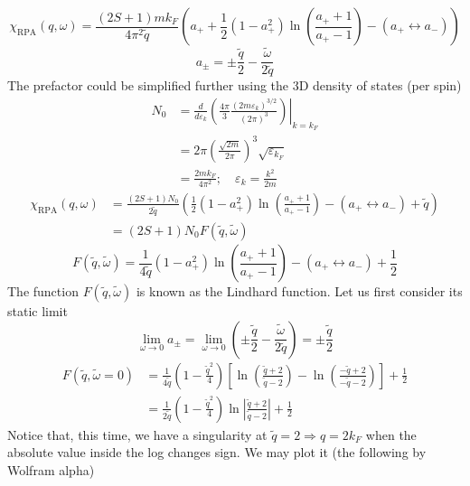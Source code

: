 \[ \chi _{\mathrm{RPA}}\left( q,\omega \right) =\frac{\left( 2S+1 \right) mk_F}{4\pi ^2\tilde{q}}\left( a_++\frac{1}{2}\left( 1-a_{+}^{2} \right) \ln \left( \frac{a_++1}{a_+-1} \right) -\left( a_+\leftrightarrow a_- \right) \right) \]
\[ a_{\pm}=\pm \frac{\tilde{q}}{2}-\frac{\tilde{\omega}}{2\tilde{q}}\]
The prefactor could be simplified further using the 3D density of states (per spin)
\begin{align*}
    N_0&=\left. \frac{d}{d\varepsilon _k}\left( \frac{4\pi}{3}\frac{\left( 2m\varepsilon _k \right) ^{3/2}}{\left( 2\pi \right) ^3} \right) \right|_{k=k_F}\\
    &=2\pi \left( \frac{\sqrt{2m}}{2\pi} \right) ^3\sqrt{\varepsilon _{k_F}}\\
    &=\frac{2mk_F}{4\pi ^2};\quad \varepsilon _k=\frac{k^2}{2m}
\end{align*}
\begin{align*}
    \chi _{\mathrm{RPA}}\left( q,\omega \right) &=\frac{\left( 2S+1 \right) N_0}{2\tilde{q}}\left( \frac{1}{2}\left( 1-a_{+}^{2} \right) \ln \left( \frac{a_++1}{a_+-1} \right) -\left( a_+\leftrightarrow a_- \right) +\tilde{q} \right) \\
    &=\left( 2S+1 \right) N_0F\left( \tilde{q},\tilde{\omega} \right)
\end{align*}
\[ F\left( \tilde{q},\tilde{\omega} \right) =\frac{1}{4\tilde{q}}\left( 1-a_{+}^{2} \right) \ln \left( \frac{a_++1}{a_+-1} \right) -\left( a_+\leftrightarrow a_- \right) +\frac{1}{2}\]
The function $F(\tilde{q},\tilde{\omega})$ is known as the Lindhard function. Let us first consider its static limit
\[ \lim_{\omega \rightarrow 0} a_{\pm}=\lim_{\omega \rightarrow 0} \left( \pm \frac{\tilde{q}}{2}-\frac{\tilde{\omega}}{2\tilde{q}} \right) =\pm \frac{\tilde{q}}{2}\]
\begin{align*}
    F\left( \tilde{q},\tilde{\omega}=0 \right) &=\frac{1}{4\tilde{q}}\left( 1-\frac{\tilde{q}^2}{4} \right) \left[ \ln \left( \frac{\tilde{q}+2}{\tilde{q}-2} \right) -\ln \left( \frac{-\tilde{q}+2}{-\tilde{q}-2} \right) \right] +\frac{1}{2}\\
    &=\frac{1}{2\tilde{q}}\left( 1-\frac{\tilde{q}^2}{4} \right) \ln \left| \frac{\tilde{q}+2}{\tilde{q}-2} \right|+\frac{1}{2}
\end{align*}
Notice that, this time, we have a singularity at $\tilde{q}=2 \Rightarrow q=2k_F$ when the absolute value inside the log changes sign. We may plot it (the following by Wolfram alpha)
